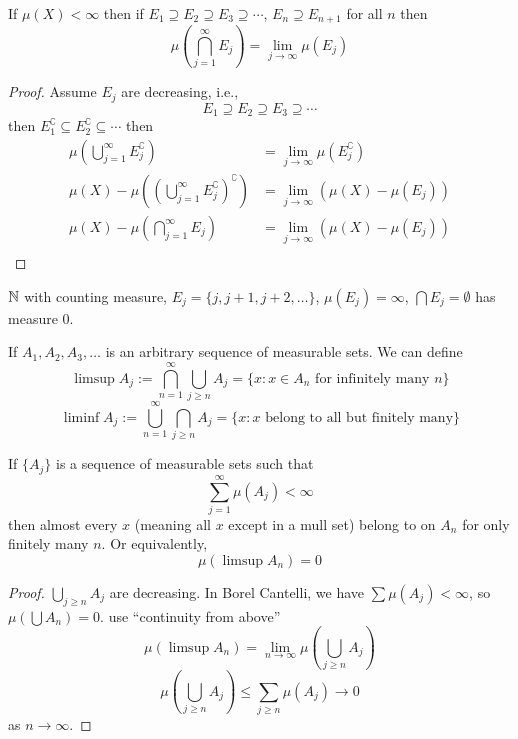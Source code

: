 \begin{theorem}
  If $\mu(X) < \infty$ then if $E_1 \supseteq E_2 \supseteq E_3 \supseteq \dotsm$, $E_n \supseteq E_{n+1}$ for all $n$ then
  \[\mu\left(\bigcap_{j=1}^\infty E_j\right) = \lim_{j \to \infty} \mu(E_j)\] 
\end{theorem}

\begin{proof}
  Assume $E_j$ are decreasing, i.e.,
  \[E_1 \supseteq E_2 \supseteq E_3 \supseteq \dotsm \]
  then $E_1^\complement \subseteq E_2^\complement \subseteq \dotsm$ then
  \begin{align*}
  \mu\left(\bigcup_{j=1}^\infty E_j^\complement\right) &= \lim_{j \to \infty} \mu(E_j^\complement) \\
  \mu(X) - \mu\left(\left(\bigcup_{j=1}^\infty E_j^\complement\right)^\complement\right) &= \lim_{j \to \infty}( \mu(X) - \mu(E_j) )\\
  \mu(X) - \mu\left(\bigcap_{j=1}^\infty E_j\right) &= \lim_{j \to \infty} (\mu(X) - \mu(E_j)) \\
  \end{align*}
\end{proof}

\begin{example}
  $\mathbb N$ with counting measure, $E_{j} = \{j, j+1, j+2, \dotsc\}$, $\mu(E_j) = \infty$,
  $\bigcap{E_j} = \emptyset$ has measure 0.
\end{example}

\begin{definition}
  If $A_1, A_2, A_3, \dotsc$ is an arbitrary sequence of measurable sets. 
  We can define 
  \[\limsup A_j := \bigcap_{n=1}^\infty \bigcup_{j \ge n} A_j = \{x : x \in A_n \text{ for infinitely many }n\}\]
  \[\liminf A_j := \bigcup_{n=1}^\infty \bigcap_{j \ge n} A_j = \{x : x \text{ belong to all but finitely many}\}\]
\end{definition}

\begin{lemma}
  If $\{A_j\}$ is a sequence of measurable sets such that 
  \[\sum_{j=1}^\infty \mu(A_j) < \infty\]
  then almost every $x$ (meaning all $x$ except in a mull set) belong to on $A_n$ for only finitely many $n$.
  Or equivalently, 
  \[\mu\left(\limsup A_n\right) = 0\]
\end{lemma}

\begin{proof}
  $\bigcup_{j \ge n} A_j$ are decreasing. In Borel Cantelli, we have $\sum \mu(A_j) < \infty$, so $\mu\left(\bigcup A_n\right) = 0$. 
  use ``continuity from above'' $$\mu(\limsup A_n) = \lim_{n \to \infty} \mu\left(\bigcup_{j \ge n} A_j\right)$$
  \[\mu\left(\bigcup_{j \ge n} A_j\right) \le \sum_{j \ge n} \mu(A_j) \to 0\]
  as $n \to \infty$.
\end{proof}


